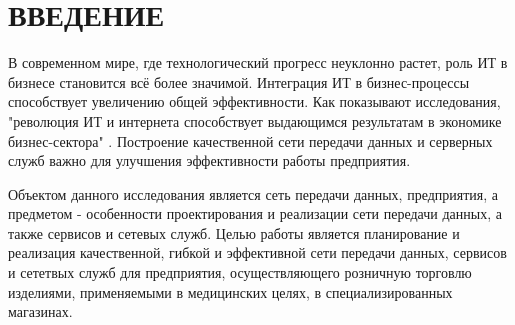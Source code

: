 \documentclass[14pt, a4paper]{extarticle}
\numberwithin{equation}{section}
\begin{document}

\pretocmd{\section}{\newpage}{}{}

\def\contentsname{СОДЕРЖАНИЕ}

\begin{titlepage}

\end{titlepage}
\tableofcontents



\section*{ВВЕДЕНИЕ}
\setcounter{page}{4}

В современном мире, где технологический прогресс неуклонно растет, роль ИТ в бизнесе становится всё более значимой. Интеграция ИТ в бизнес-процессы способствует увеличению общей эффективности. Как показывают исследования, "революция ИТ и интернета способствует выдающимся результатам в экономике бизнес-сектора" \cite{mgunda2019impacts}. Построение качественной сети передачи данных и серверных служб важно для улучшения эффективности работы предприятия.

Объектом данного исследования является сеть передачи данных, предприятия, 
а предметом - особенности проектирования и реализации сети передачи данных, а также сервисов и сетевых служб. 
Целью работы является планирование и реализация качественной, гибкой и 
эффективной сети передачи данных, сервисов и сететвых служб для предприятия, осуществляющего розничную 
торговлю изделиями, применяемыми в медицинских целях, в специализированных магазинах.
\end{document}
